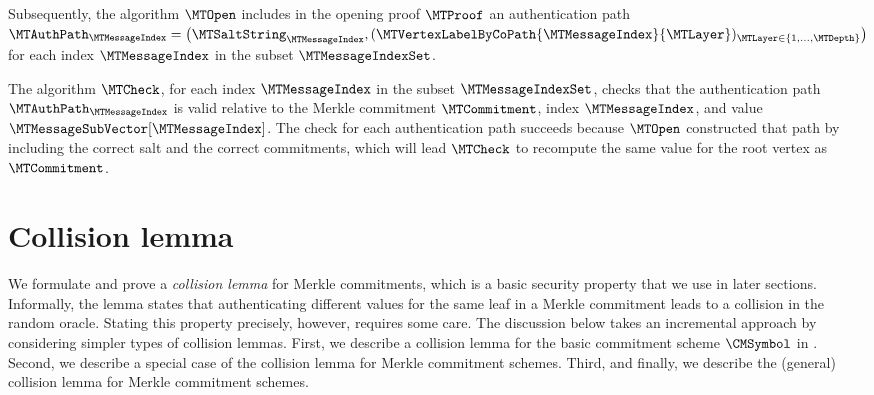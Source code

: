 Subsequently, the algorithm $\MTOpen$ includes in the opening proof $\MTProof$ an authentication path $\MTAuthPath_{\MTMessageIndex} = \big(\MTSaltString_{\MTMessageIndex},(\MTVertexLabelByCoPath{\MTMessageIndex}{\MTLayer})_{\MTLayer \in \{1,\dots,\MTDepth\}}\big)$ for each index $\MTMessageIndex$ in the subset $\MTMessageIndexSet$.

The algorithm $\MTCheck$, for each index $\MTMessageIndex$ in the subset $\MTMessageIndexSet$, checks that the authentication path $\MTAuthPath_{\MTMessageIndex}$ is valid relative to the Merkle commitment $\MTCommitment$, index $\MTMessageIndex$, and value $\MTMessageSubVector[\MTMessageIndex]$. The check for each authentication path succeeds because $\MTOpen$ constructed that path by including the correct salt and the correct commitments, which will lead $\MTCheck$ to recompute the same value for the root vertex as $\MTCommitment$.



\section{Collision lemma}
\label{section:merkle-commitment-collision-lemma}

We formulate and prove a \emph{collision lemma} for Merkle commitments, which is a basic security property that we use in later sections. Informally, the lemma states that authenticating different values for the same leaf in a Merkle commitment leads to a collision in the random oracle. Stating this property precisely, however, requires some care. The discussion below takes an incremental approach by considering simpler types of collision lemmas. First, we describe a collision lemma for the basic commitment scheme $\CMSymbol$ in . Second, we describe a special case of the collision lemma for Merkle commitment schemes. Third, and finally, we describe the (general) collision lemma for Merkle commitment schemes.

